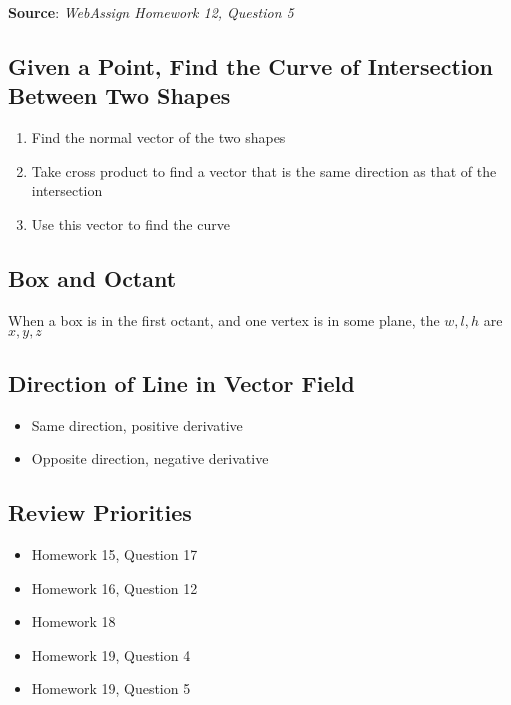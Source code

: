     \textbf{Source}: \textit{WebAssign Homework 12, Question 5}

  \subsection{Given a Point, Find the Curve of Intersection Between Two Shapes}

    \begin{enumerate}
      \item Find the normal vector of the two shapes
      \item Take cross product to find a vector that is the same direction
      as that of the intersection
      \item Use this vector to find the curve
    \end{enumerate}

  \subsection{Box and Octant}

    When a box is in the first octant, and one vertex is in
    some plane, the $ w, l, h $ are $ x, y, z $

  \subsection{Direction of Line in Vector Field}

    \begin{itemize}
      \item Same direction, positive derivative
      \item Opposite direction, negative derivative
    \end{itemize}

  \subsection{Review Priorities}

    \begin{itemize}
      \item Homework 15, Question 17
      \item Homework 16, Question 12
      \item Homework 18
      \item Homework 19, Question 4
      \item Homework 19, Question 5
    \end{itemize}